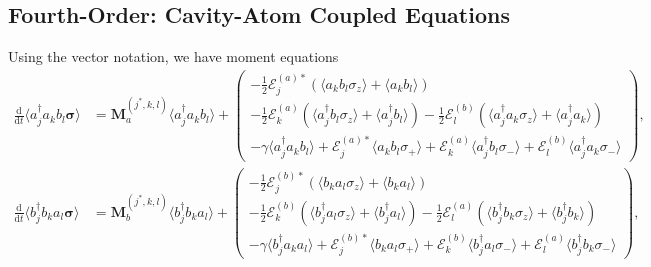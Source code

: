 \documentclass{article}
\newcommand{\ddt}[1][]{\frac{\mathrm{d} #1}{\mathrm{d}t}}
\begin{document}
\subsection{Fourth-Order: Cavity-Atom Coupled Equations}

Using the vector notation, we have moment equations
\begin{subequations}
	\begin{align}
		\ddt \langle a^{\dagger}_{j} a_{k} b_{l} \bm{\sigma} \rangle &= \bm{M}^{(j^{*}, k, l)}_{a} \langle a^{\dagger}_{j} a_{k} b_{l} \rangle + 
		\begin{pmatrix}
			-\frac{1}{2} \mathcal{E}_{j}^{(a) *} \left( \langle a_{k} b_{l} \sigma_{z} \rangle + \langle a_{k} b_{l} \rangle \right) \\
			-\frac{1}{2} \mathcal{E}_{k}^{(a)} \left( \langle a^{\dagger}_{j} b_{l} \sigma_{z} \rangle + \langle a^{\dagger}_{j} b_{l} \rangle \right) - \frac{1}{2} \mathcal{E}_{l}^{(b)} \left( \langle a^{\dagger}_{j} a_{k} \sigma_{z} \rangle + \langle a^{\dagger}_{j} a_{k} \rangle \right) \\
			-\gamma \langle a^{\dagger}_{j} a_{k} b_{l} \rangle + \mathcal{E}_{j}^{(a) *} \langle a_{k} b_{l} \sigma_{+} \rangle + \mathcal{E}_{k}^{(a)} \langle a^{\dagger}_{j} b_{l} \sigma_{-} \rangle + \mathcal{E}_{l}^{(b)} \langle a^{\dagger}_{j} a_{k} \sigma_{-} \rangle
		\end{pmatrix}, \\
		\ddt \langle b^{\dagger}_{j} b_{k} a_{l} \bm{\sigma} \rangle &= \bm{M}^{(j^{*}, k, l)}_{b} \langle b^{\dagger}_{j} b_{k} a_{l} \rangle + 
		\begin{pmatrix}
			-\frac{1}{2} \mathcal{E}_{j}^{(b) *} \left( \langle b_{k} a_{l} \sigma_{z} \rangle + \langle b_{k} a_{l} \rangle \right) \\
			-\frac{1}{2} \mathcal{E}_{k}^{(b)} \left( \langle b^{\dagger}_{j} a_{l} \sigma_{z} \rangle + \langle b^{\dagger}_{j} a_{l} \rangle \right) - \frac{1}{2} \mathcal{E}_{l}^{(a)} \left( \langle b^{\dagger}_{j} b_{k} \sigma_{z} \rangle + \langle b^{\dagger}_{j} b_{k} \rangle \right) \\
			-\gamma \langle b^{\dagger}_{j} a_{k} a_{l} \rangle + \mathcal{E}_{j}^{(b) *} \langle b_{k} a_{l} \sigma_{+} \rangle + \mathcal{E}_{k}^{(b)} \langle b^{\dagger}_{j} a_{l} \sigma_{-} \rangle + \mathcal{E}_{l}^{(a)} \langle b^{\dagger}_{j} b_{k} \sigma_{-} \rangle
		\end{pmatrix},
	\end{align}
\end{subequations}
\end{document}
